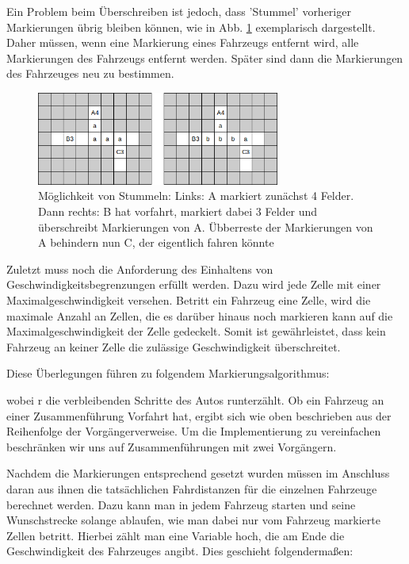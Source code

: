 \documentclass[11pt, a4paper]{article}
\begin{document}
Ein Problem beim Überschreiben ist jedoch, dass 'Stummel' vorheriger Markierungen übrig bleiben können, wie in Abb. \ref{fig:overwritingCanCauseStubs} exemplarisch dargestellt. Daher müssen, wenn eine Markierung eines Fahrzeugs entfernt wird, alle Markierungen des Fahrzeugs entfernt werden. Später sind dann die Markierungen des Fahrzeuges neu zu bestimmen.
\begin{figure}[h!]
	\centering
	\includegraphics[width=8cm]{img/stubs}
	\caption{Möglichkeit von Stummeln: Links: A markiert zunächst 4 Felder. Dann rechts: B hat vorfahrt, markiert dabei 3 Felder und überschreibt Markierungen von A. Übberreste der Markierungen von A behindern nun C, der eigentlich fahren könnte}
	\label{fig:overwritingCanCauseStubs}
\end{figure}

Zuletzt muss noch die Anforderung des Einhaltens von Geschwindigkeitsbegrenzungen erfüllt werden. Dazu wird jede Zelle mit einer Maximalgeschwindigkeit versehen. Betritt ein Fahrzeug eine Zelle, wird die maximale Anzahl an Zellen, die es darüber hinaus noch markieren kann auf die Maximalgeschwindigkeit der Zelle gedeckelt. Somit ist gewährleistet, dass kein Fahrzeug an keiner Zelle die zulässige Geschwindigkeit überschreitet.

Diese Überlegungen führen zu folgendem Markierungsalgorithmus:

wobei r die verbleibenden Schritte des Autos runterzählt. Ob ein Fahrzeug an einer Zusammenführung Vorfahrt hat, ergibt sich wie oben beschrieben aus der Reihenfolge der Vorgängerverweise. Um die Implementierung zu vereinfachen beschränken wir uns auf Zusammenführungen mit zwei Vorgängern.

Nachdem die Markierungen entsprechend gesetzt wurden müssen im Anschluss daran aus ihnen die tatsächlichen Fahrdistanzen für die einzelnen Fahrzeuge berechnet werden. Dazu kann man in jedem Fahrzeug starten und seine Wunschstrecke solange ablaufen, wie man dabei nur vom Fahrzeug markierte Zellen betritt. Hierbei zählt man eine Variable hoch, die am Ende die Geschwindigkeit des Fahrzeuges angibt. Dies geschieht folgendermaßen:

\end{document}
